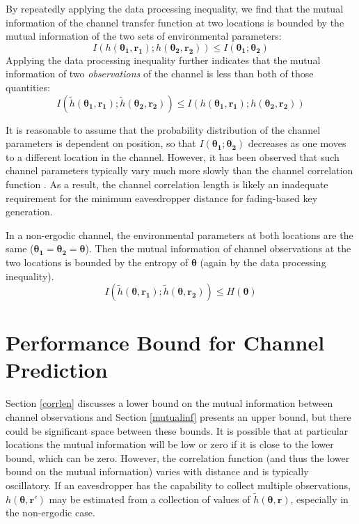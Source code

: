 \documentclass[conference]{ieeetran}
\begin{document}
By repeatedly applying the data processing inequality, we find that the mutual information of the channel transfer function at two locations is bounded by the mutual information of the two sets of environmental parameters:
\begin{equation}
I(h(\boldsymbol{\theta_1},\mathbf{r_1}); h(\boldsymbol{\theta_2},\mathbf{r_2}))\leq I(\boldsymbol{\theta_1}; \boldsymbol{\theta_2})
\end{equation}
Applying the data processing inequality further indicates that the mutual information of two \emph{observations} of the channel is less than both of those quantities:
\begin{equation}
I(\tilde{h}(\boldsymbol{\theta_1},\mathbf{r_1}); \tilde{h}(\boldsymbol{\theta_2},\mathbf{r_2}))\leq I(h(\boldsymbol{\theta_1},\mathbf{r_1}); h(\boldsymbol{\theta_2},\mathbf{r_2}))
\end{equation}

It is reasonable to assume that the probability distribution of the channel parameters is dependent on position, so that $I(\boldsymbol{\theta_1}; \boldsymbol{\theta_2})$ decreases as one moves to a different location in the channel.  However, it has been observed that such channel parameters typically vary much more slowly than the channel correlation function \cite{jakes1974, duel-hallen2007}.  As a result, the channel correlation length is likely an inadequate requirement for the minimum eavesdropper distance for fading-based key generation.

In a non-ergodic channel, the environmental parameters at both locations are the same ($\boldsymbol{\theta_1}=\boldsymbol{\theta_2}=\boldsymbol{\theta}$). Then the mutual information of channel observations at the two locations is bounded by the entropy of $\boldsymbol{\theta}$ (again by the data processing inequality).
\begin{equation}
I(\tilde{h}(\boldsymbol{\theta},\mathbf{r_1}); \tilde{h}(\boldsymbol{\theta},\mathbf{r_2}))\leq H(\boldsymbol{\theta})
\end{equation}

\section{Performance Bound for Channel Prediction}

Section \ref{corrlen} discusses a lower bound on the mutual information between channel observations and Section \ref{mutualinf} presents an upper bound, but there could be significant space between these bounds.  It is possible that at particular locations the mutual information will be low or zero if it is close to the lower bound, which can be zero.  However, the correlation function (and thus the lower bound on the mutual information) varies with distance and is typically oscillatory.  If an eavesdropper has the capability to collect multiple observations, $h(\boldsymbol{\theta},\mathbf{r'})$ may be estimated from a collection of values of $\tilde{h}(\boldsymbol{\theta},\mathbf{r})$, especially in the non-ergodic case.
\end{document}
